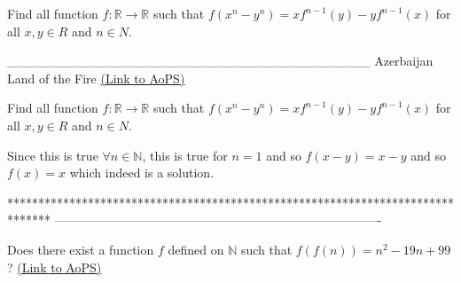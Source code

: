 \begin{problem}
	Find all function $f: \mathbb{R}\to\mathbb{R}$ such that $f(x^n-y^n)=xf^{n-1}(y)-yf^{n-1}(x)$ for all $x,y{\in}R$  and $n{\in}N$.


_______________________________________
Azerbaijan Land of the Fire 
	\flushright \href{https://artofproblemsolving.com/community/c6h531174}{(Link to AoPS)}
\end{problem}



\begin{solution}
	\begin{tcolorbox}Find all function $f: \mathbb{R}\to\mathbb{R}$ such that $f(x^n-y^n)=xf^{n-1}(y)-yf^{n-1}(x)$ for all $x,y{\in}R$  and $n{\in}N$.\end{tcolorbox}
Since this is true $\forall n\in\mathbb N$, this is true for $n=1$ and so $f(x-y)=x-y$ and so $\boxed{f(x)=x}$ which indeed is a solution.
\end{solution}
*******************************************************************************
-------------------------------------------------------------------------------

\begin{problem}
	Does there exist a function $f$ defined on $\mathbb{N}$ such that $f(f(n))=n^2-19n+99$ ?
	\flushright \href{https://artofproblemsolving.com/community/c6h531177}{(Link to AoPS)}
\end{problem}



